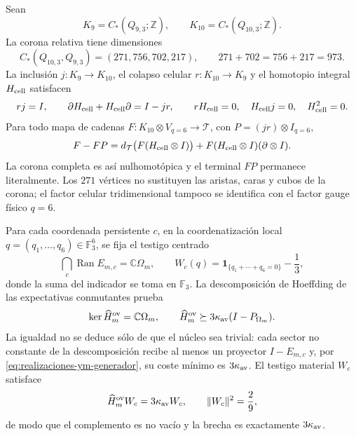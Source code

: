 Sean
\[
 K_9=C_*(Q_{9,3};\mathbb Z),\qquad
 K_{10}=C_*(Q_{10,3};\mathbb Z).
\]
La corona relativa tiene dimensiones
\[
 C_*(Q_{10,3},Q_{9,3})=(271,756,702,217),
 \qquad 271+702=756+217=973.
\]
La inclusión \(j:K_9\to K_{10}\), el colapso celular
\(r:K_{10}\to K_9\) y el homotopio integral \(H_{\rm cell}\) satisfacen
\begin{equation}\label{eq:realizaciones-ym-sdr-corona}
 rj=I,\qquad
 \partial H_{\rm cell}+H_{\rm cell}\partial=I-jr,\qquad
 rH_{\rm cell}=0,\quad H_{\rm cell}j=0,\quad H_{\rm cell}^2=0.
\end{equation}
Para todo mapa de cadenas
\(F:K_{10}\otimes V_{q=6}\to\mathcal T\), con
\(P=(jr)\otimes I_{q=6}\),
\begin{equation}\label{eq:realizaciones-ym-homotopia-terminal}
 F-FP
 =d_{\mathcal T}\bigl(F(H_{\rm cell}\otimes I)\bigr)
  +F(H_{\rm cell}\otimes I)(\partial\otimes I).
\end{equation}
La corona completa es así nulhomotópica y el terminal \(FP\) permanece
literalmente. Los \(271\) vértices no sustituyen las aristas, caras y cubos
de la corona; el factor celular tridimensional tampoco se identifica con el
factor gauge físico \(q=6\).

Para cada coordenada persistente \(c\), en la coordenatización local
\(q=(q_1,\ldots,q_6)\in\mathbb F_3^6\), se fija el testigo centrado
\begin{equation}\label{eq:realizaciones-ym-testigo-definicion}
 \bigcap_c\operatorname{Ran}E_{m,c}=\mathbb C\Omega_m,
 \qquad
 W_c(q)=\mathbf 1_{\{q_1+\cdots+q_6=0\}}-\frac13,
\end{equation}
donde la suma del indicador se toma en \(\mathbb F_3\). La descomposición de
Hoeffding de las expectativas conmutantes prueba
\begin{equation}\label{eq:realizaciones-ym-gap-finito}
 \ker\widehat H_m^{\rm ov}=\mathbb C\Omega_m,
 \qquad
 \widehat H_m^{\rm ov}\succeq
 3\kappa_{\rm av}(I-P_{\Omega_m}).
\end{equation}
La igualdad no se deduce sólo de que el núcleo sea trivial: cada sector no
constante de la descomposición recibe al menos un proyector
\(I-E_{m,c}\) y, por \eqref{eq:realizaciones-ym-generador}, su coste mínimo
es \(3\kappa_{\rm av}\). El testigo material \(W_c\) satisface
\begin{equation}\label{eq:realizaciones-ym-testigo-gap}
 \widehat H_m^{\rm ov}W_c=3\kappa_{\rm av}W_c,
 \qquad \|W_c\|^2=\frac29,
\end{equation}
de modo que el complemento es no vacío y la brecha es exactamente
\(3\kappa_{\rm av}\).

